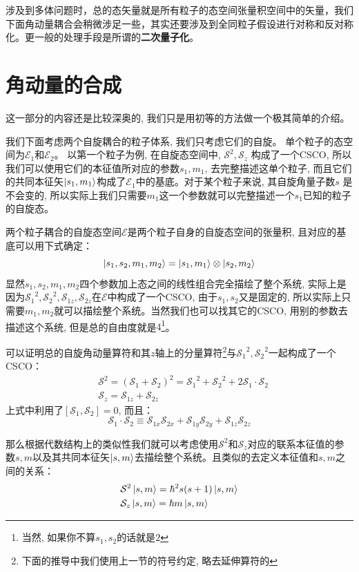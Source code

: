 \documentclass[a4paper,zihao=-4,linespread=1]{ctexrep}
\begin{document}
    涉及到多体问题时，总的态矢量就是所有粒子的态空间张量积空间中的矢量，我们下面角动量耦合会稍微涉足一些，其实还要涉及到全同粒子假设进行对称和反对称化。更一般的处理手段是所谓的\textbf{二次量子化}。

    \section{角动量的合成}
    这一部分的内容还是比较深奥的, 我们只是用初等的方法做一个极其简单的介绍。

    我们下面考虑两个自旋耦合的粒子体系, 我们只考虑它们的自旋。 单个粒子的态空间为$\mathscr{E}_1$和$\mathscr{E}_2$。 以第一个粒子为例, 在自旋态空间中, $\mathcal{S}^2, \mathcal{S}_z$
    构成了一个CSCO, 所以我们可以使用它们的本征值所对应的参数$s_1,m_1$, 去完整描述这单个粒子, 而且它们的共同本征矢$\ket{s_1,m_1}$构成了$\mathscr{E}_1$中的基底。对于某个粒子来说, 其自旋角量子数$s$
    是不会变的, 所以实际上我们只需要$m_1$这一个参数就可以完整描述一个$s_1$已知的粒子的自旋态。
    
    两个粒子耦合的自旋态空间$\mathscr{E}$是两个粒子自身的自旋态空间的张量积, 且对应的基底可以用下式确定：
    \[\ket{s_1,s_2,m_1,m_2}=\ket{s_1,m_1}\otimes\ket{s_2,m_2}\]
    显然$s_1,s_2,m_1,m_2$四个参数加上态之间的线性组合完全描绘了整个系统, 实际上是因为${\mathcal{S}_1}^2,{\mathcal{S}_2}^2,{\mathcal{S}_{1z}},{\mathcal{S}_{2z}}$在$\mathscr{E}$中构成了一个CSCO,
    由于$s_1,s_2$又是固定的, 所以实际上只需要$m_1,m_2$就可以描绘整个系统。当然我们也可以找其它的CSCO, 用别的参数去描述这个系统, 但是总的自由度就是$4$\footnote{当然, 如果你不算$s_1,s_2$的话就是$2$}。

    可以证明总的自旋角动量算符和其$z$轴上的分量算符\footnote{下面的推导中我们使用上一节的符号约定, 略去延伸算符的$\tilde{}$}与${\mathcal{S}_1}^2,{\mathcal{S}_2}^2$一起构成了一个CSCO：
    \begin{align}
        &\mathcal{S}^2=\left(\mathcal{S}_1+\mathcal{S}_2\right)^2={\mathcal{S}_1}^2+{\mathcal{S}_2}^2+2\mathcal{S}_1\cdot\mathcal{S}_2\\
        &\mathcal{S}_z=\mathcal{S}_{1z}+\mathcal{S}_{2z}
    \end{align}
    上式中利用了$\left[\mathcal{S}_1,\mathcal{S}_2\right]=0$, 而且：
    \[\mathcal{S}_1\cdot\mathcal{S}_2\equiv\mathcal{S}_{1x}\mathcal{S}_{2x}+\mathcal{S}_{1y}\mathcal{S}_{2y}+\mathcal{S}_{1z}\mathcal{S}_{2z}\]
    
    那么根据代数结构上的类似性我们就可以考虑使用$\mathcal{S}^2$和$\mathcal{S}_z$对应的联系本征值的参数$s,m$以及其共同本征矢$\ket{s,m}$去描绘整个系统。且类似的去定义本征值和$s,m$之间的关系：
    \begin{align}
        &\mathcal{S}^2\ket{s,m}=\hbar^2s(s+1)\ket{s,m}\\
        &\mathcal{S}_z\ket{s,m}=\hbar m\ket{s,m}    
    \end{align}
    
\end{document}
